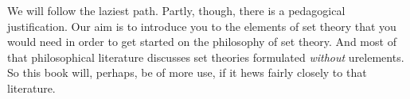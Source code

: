 \documentclass[../../../include/open-logic-section]{subfiles}
\begin{document}
We will follow the laziest path. Partly, though, there is a
pedagogical justification. Our aim is to introduce you to the elements
of set theory that you would need in order to get started on the
philosophy of set theory. And most of that philosophical literature
discusses set theories formulated \emph{without} urelements. So this
book will, perhaps, be of more use, if it hews fairly closely to that
literature.
\end{document}

